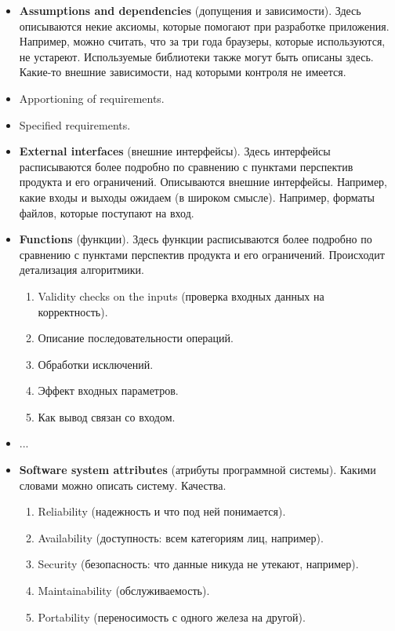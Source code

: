 \begin{Def}
\begin{itemize}
            \item \textbf{Assumptions and dependencies} (допущения и зависимости). Здесь описываются некие аксиомы, которые помогают при разработке приложения. Например, можно считать, что за три года браузеры, которые используются, не устареют. Используемые библиотеки также могут быть описаны здесь. Какие-то внешние зависимости, над которыми контроля не имеется.

            \item Apportioning of requirements.

            \item Specified requirements.

            \item \textbf{External interfaces} (внешние интерфейсы). Здесь интерфейсы расписываются более подробно по сравнению с пунктами перспектив продукта и его ограничений. Описываются внешние интерфейсы. Например, какие входы и выходы ожидаем (в широком смысле). Например, форматы файлов, которые поступают на вход.

            \item \textbf{Functions} (функции). Здесь функции расписываются более подробно по сравнению с пунктами перспектив продукта и его ограничений. Происходит детализация алгоритмики.
            \begin{enumerate}
                \item Validity checks on the inputs (проверка входных данных на корректность).
                \item Описание последовательности операций.
                \item Обработки исключений.
                \item Эффект входных параметров.
                \item Как вывод связан со входом.
            \end{enumerate}

            \item ...

            \item \textbf{Software system attributes} (атрибуты программной системы). Какими словами можно описать систему. Качества.
            \begin{enumerate}
                \item Reliability (надежность и что под ней понимается).
                \item Availability (доступность: всем категориям лиц, например).
                \item Security (безопасность: что данные никуда не утекают, например).
                \item Maintainability (обслуживаемость).
                \item Portability  (переносимость с одного железа на другой).
            \end{enumerate}


\end{itemize}
\end{Def}
